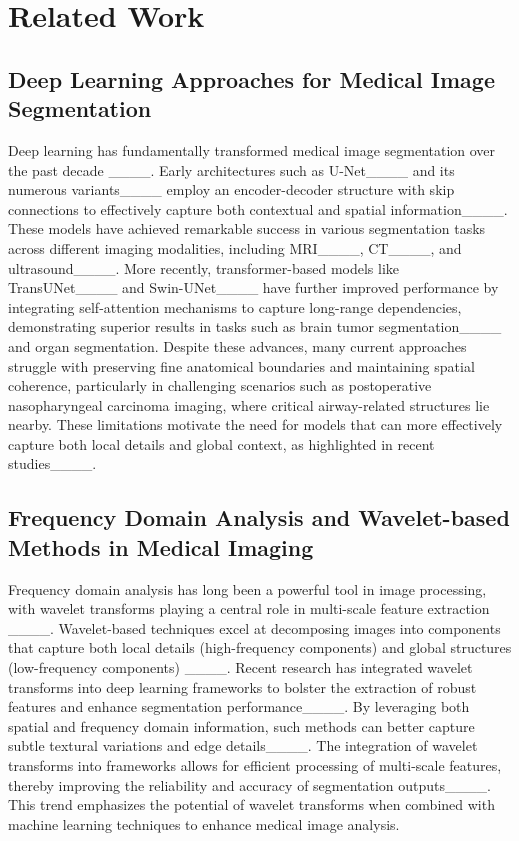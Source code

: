 \section{Related Work}
\subsection{Deep Learning Approaches for Medical Image Segmentation}
Deep learning has fundamentally transformed medical image segmentation over the past decade ____. 
Early architectures such as U-Net____ and its numerous variants____ employ an encoder-decoder structure with skip connections to effectively capture both contextual and spatial information____. 
These models have achieved remarkable success in various segmentation tasks across different imaging modalities, including MRI____, CT____, and ultrasound____. 
More recently, transformer-based models like TransUNet____ and Swin-UNet____ have further improved performance by integrating self-attention mechanisms to capture long-range dependencies, demonstrating superior results in tasks such as brain tumor segmentation____ and organ segmentation. 
Despite these advances, many current approaches struggle with preserving fine anatomical boundaries and maintaining spatial coherence, particularly in challenging scenarios such as postoperative nasopharyngeal carcinoma imaging, where critical airway-related structures lie nearby. 
These limitations motivate the need for models that can more effectively capture both local details and global context, as highlighted in recent studies____.

\subsection{Frequency Domain Analysis and Wavelet-based Methods in Medical Imaging}
Frequency domain analysis has long been a powerful tool in image processing, with wavelet transforms playing a central role in multi-scale feature extraction ____. 
Wavelet-based techniques excel at decomposing images into components that capture both local details (high-frequency components) and global structures (low-frequency components) ____. 
Recent research has integrated wavelet transforms into deep learning frameworks to bolster the extraction of robust features and enhance segmentation performance____. By leveraging both spatial and frequency domain information, such methods can better capture subtle textural variations and edge details____. 
The integration of wavelet transforms into frameworks allows for efficient processing of multi-scale features, thereby improving the reliability and accuracy of segmentation outputs____. 
This trend emphasizes the potential of wavelet transforms when combined with machine learning techniques to enhance medical image analysis.

